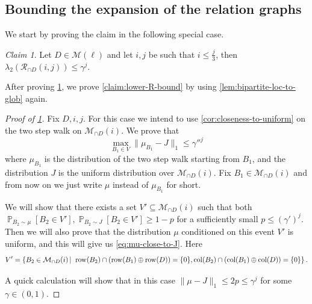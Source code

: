 \documentclass[10pt,a4paper]{article}
\newcommand{\prettyref}[1]{\cref{#1}}
\theoremstyle{definition}
\theoremstyle{remark}
\newtheorem{claim}[theorem]{Claim}
\newcommand\sett[2]{\left\{ #1 \left| \; \vphantom{#1 #2} \right. #2  \right\}}
\newcommand{\set}[1]{\{#1\}}
\newcommand{\norm}[1]{\lVert#1\rVert}
\newcommand{\Psymb}{\mathbb{P}}
\DeclareMathOperator*{\ProbOp}{\Psymb}
\renewcommand{\Pr}{\ProbOp}
\newcommand{\Prob}[2][]{\Pr_{{#1}}\left[#2\right]} %
\DeclareMathOperator{\row}{row}
\DeclareMathOperator{\col}{col}
\renewcommand{\leq}{\leqslant}
\renewcommand{\geq}{\geqslant}
\numberwithin{equation}{section}
\let\pref=\prettyref
\def\MP{\mathcal{M}}
\begin{document}
\subsection{Bounding the expansion of the relation graphs}
We start by proving the claim in the following special case.
\begin{claim} \label{claim:lower-bound-relation-i-small}
    Let \(D \in \MP(\ell)\) and let \(i,j\) be such that \(i \leq \frac{j}{3}\), then 
    \(\lambda_2(\mathcal{R}_{\cap D}(i,j)) \leq \gamma^{ j}.\)
\end{claim}

After proving \pref{claim:lower-bound-relation-i-small}, we prove \pref{claim:lower-R-bound} by using \pref{lem:bipartite-loc-to-glob} again.

\begin{proof}[Proof of \pref{claim:lower-bound-relation-i-small}]
    Fix \(D,i,j\). For this case we intend to use \pref{cor:closeness-to-uniform} on the two step walk on \(\MP_{\cap D}(i)\). We prove that 
\begin{equation} \label{eq:mu-close-to-J}
    \max_{B_1 \in V} \norm{\mu_{B_1} - J}_1 \leq \gamma''^{j}
\end{equation}
where \(\mu_{B_1}\) is the distribution of the two step walk starting from \(B_1\), and the distribution \(J\) is the uniform distribution over \(\MP_{\cap D}(i)\). Fix \(B_1 \in \MP_{\cap D}(i)\) and from now on we just write \(\mu\) instead of \(\mu_{B_1}\) for short. 

We will show that there exists a set \(V' \subseteq \MP_{\cap D}(i)\) such that both \(\Prob[B_2 \sim \mu]{B_2 \in V'}, \Prob[B_2 \sim J]{B_2 \in V'} \geq 1-p\) for a sufficiently small \(p \leq (\gamma')^{j}\). Then we will also prove that the distribution \(\mu\) conditioned on this event \(V'\) is uniform, and this will give us \eqref{eq:mu-close-to-J}. Here 
\[V' = \sett{B_2 \in \MP_{\cap D}(i)}{\row(B_2) \cap (\row(B_1) \oplus \row(D)) = \set{0},  \col(B_2)\cap (\col(B_1) \oplus \col(D)) = \set{0}}.\]

A quick calculation will show that in this case \(\norm{\mu - J}_1 \leq 2p \leq \gamma^{j}\) for some \(\gamma \in (0,1)\).


\end{proof}
\end{document}
